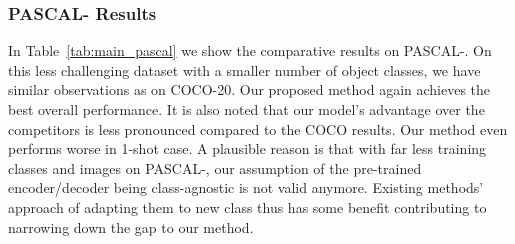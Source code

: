 \documentclass[10pt,twocolumn,letterpaper]{article}
\begin{document}
\subsubsection{PASCAL- Results}

In Table~\ref{tab:main_pascal} we show the comparative results on PASCAL-. 
On this less challenging dataset with a smaller number of object 
classes, we have similar observations as on COCO-20.
Our proposed method again achieves the best overall performance.
It is also noted that our model's advantage over the competitors is less pronounced compared to the COCO results.
Our method even performs worse in 1-shot case.
A plausible reason is that with far less training classes and images on PASCAL-, our assumption of the pre-trained encoder/decoder being class-agnostic is not valid anymore. Existing methods' approach of adapting them to new class thus has some benefit contributing to narrowing down the gap to our method. 
\end{document}
